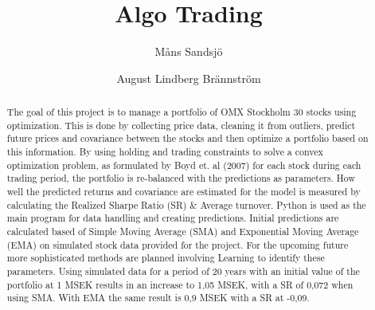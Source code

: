 \documentclass{LTHtwocol} %
\begin{document}
\begin{frontmatter}
\title{Algo Trading} %

\author[måns]{Måns Sandsjö}
\author[august]{August Lindberg Brännström}


\begin{abstract}
The goal of this project is to manage a portfolio of OMX Stockholm 30 stocks using optimization. This is done by collecting price data, cleaning it from outliers, predict future prices and covariance between the stocks and then optimize a portfolio based on this information. By using holding and trading constraints to solve a convex optimization problem, as formulated by Boyd et. al (2007) for each stock during each trading period, the portfolio is re-balanced with the predictions as parameters. How well the predicted returns and covariance are estimated for the model is measured by calculating the Realized Sharpe Ratio (SR) \& Average turnover. Python is used as the main program for data handling and creating predictions. Initial predictions are calculated based of Simple Moving Average (SMA) and Exponential Moving Average (EMA) on simulated stock data provided for the project. For the upcoming future more sophisticated methods are planned involving Learning to identify these parameters. Using simulated data for a period of 20 years with an initial value of the portfolio at 1 MSEK results in an increase to 1,05 MSEK, with a SR of 0,072 when using SMA. With EMA the same result is 0,9 MSEK with a SR at -0,09.

\end{abstract}

\end{frontmatter}

\end{document}
